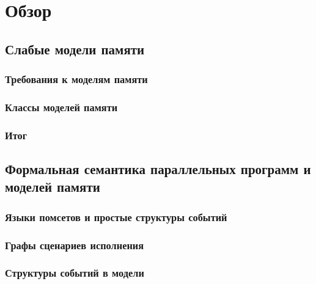 \chapter{Обзор}
\label{ch:review}

\section{Слабые модели памяти}

\subsection{Требования к моделям памяти}

\subsection{Классы моделей памяти}

\subsection{Итог}

\section{Формальная семантика параллельных программ и моделей памяти}

\subsection{Языки помсетов и простые структуры событий}

\subsection{Графы сценариев исполнения}

\subsection{Структуры событий в модели \Wkm}
